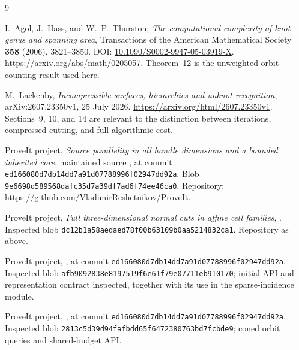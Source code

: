 \documentclass[11pt]{article}
\theoremstyle{definition}
\theoremstyle{remark}\newtheorem{remark}[theorem]{Remark}
\newcommand{\snap}{\texttt{ed166080d7db14dd7a91d07788996f02947dd92a}}
\begin{document}
\newpage
\begin{thebibliography}{9}
\small\raggedright
{}
I.~Agol, J.~Hass, and W.~P.~Thurston,
\emph{The computational complexity of knot genus and spanning area},
Transactions of the American Mathematical Society \textbf{358} (2006), 3821--3850.
DOI: \href{https://doi.org/10.1090/S0002-9947-05-03919-X}{10.1090/S0002-9947-05-03919-X}.
\url{https://arxiv.org/abs/math/0205057}. Theorem~12 is the unweighted orbit-counting result used here.

M.~Lackenby, \emph{Incompressible surfaces, hierarchies and unknot recognition},
arXiv:2607.23350v1, 25 July 2026.
\url{https://arxiv.org/html/2607.23350v1}.
Sections~9, 10, and 14 are relevant to the distinction between iterations, compressed cutting, and full algorithmic cost.

ProveIt project, \emph{Source parallelity in all handle dimensions and a bounded inherited core}, maintained source
,
at commit \snap.
Blob \texttt{9e6698d589568dafc35d7a39df7ad6f74ee46ca0}.
Repository: \url{https://github.com/VladimirReshetnikov/ProveIt}.

ProveIt project, \emph{Full three-dimensional normal cuts in affine cell families},
.
Inspected blob \texttt{dc12b1a58aedaed78f00b63109b0aa5214832ca1}.
Repository as above.

ProveIt project, ,
at commit \snap.
Inspected blob \texttt{afb9092838e8197519f6e61f79e07711eb910170}; initial API and representation contract inspected, together with its use in the sparse-incidence module.

ProveIt project, ,
at commit \snap.
Inspected blob \texttt{2813c5d39d94fafbdd65f6472380763bd7fcbde9}; coned orbit queries and shared-budget API.
\end{thebibliography}
\end{document}
